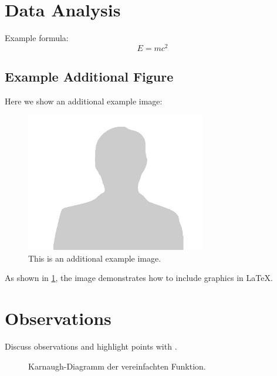\section{Data Analysis}
Example formula:
\[
E = mc^2
\]

\subsection{Example Additional Figure}
Here we show an additional example image:

\begin{figure}[h!]
    \centering
    \includegraphics[width=0.7\textwidth]{images/example-image.png}
    \caption{This is an additional example image.}
    \label{fig:example2}
\end{figure}

As shown in \cref{fig:example2}, the image demonstrates how to include graphics in LaTeX.

\section{Observations}
Discuss observations and highlight points with .


\begin{figure}[h!]
    \centering
    
    \caption{Karnaugh-Diagramm der vereinfachten Funktion.}
    \label{fig:karnaugh}
\end{figure}